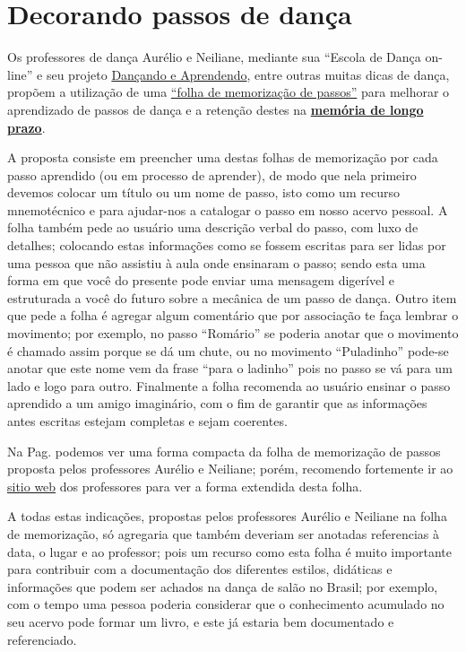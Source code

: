 
\section{Decorando passos de dança}
Os professores de dança Aurélio e Neiliane,
mediante sua ``Escola de Dança on-line'' e seu projeto 
\href{https://www.facebook.com/dancandoeaprendendo/}{Dançando e Aprendendo}, 
entre outras muitas dicas de dança,
propõem
a utilização de uma \href{https://www.youtube.com/watch?v=ePwjQx5egAo}{``folha de memorização de passos''} 
para melhorar o aprendizado de passos de dança 
e a retenção destes na \hyperref[sec:memoria:longo]{\textbf{memória de longo prazo}}.

A proposta consiste em preencher uma destas folhas de memorização
por cada passo aprendido (ou em processo de aprender),
de modo que nela primeiro devemos colocar um título ou um nome de passo,
isto como um recurso mnemotécnico e para ajudar-nos a catalogar o passo em nosso acervo pessoal.
A folha também pede ao usuário uma descrição verbal do passo, com luxo de detalhes;
colocando estas informações como se fossem escritas para ser lidas por uma pessoa 
que não assistiu à aula onde ensinaram o passo; 
sendo esta uma forma em que você do presente pode enviar 
uma mensagem digerível e estruturada a você do futuro
sobre a mecânica de um passo de dança.
Outro item que pede a folha é agregar algum comentário que por associação 
te faça lembrar o movimento; por exemplo, no passo ``Romário'' se poderia anotar que 
o movimento é chamado assim porque se dá um chute, ou 
no movimento ``Puladinho'' pode-se anotar que este nome vem da frase ``para o ladinho'' pois no passo 
se vá para um lado e logo para outro.
Finalmente a folha recomenda ao usuário
ensinar o passo aprendido a um amigo imaginário,
com o fim de garantir que as informações antes escritas estejam completas 
e sejam coerentes.

\begin{tcbattention}
Na Pag. \pageref{pos:page:folhamemorizacao} 
podemos ver uma forma compacta da folha de memorização 
de passos proposta pelos professores Aurélio e Neiliane; porém,
recomendo fortemente ir ao 
\href{https://www.youtube.com/watch?v=ePwjQx5egAo}{sitio web}
dos professores para ver a forma extendida desta folha.
\end{tcbattention}

A todas estas indicações, 
propostas pelos professores Aurélio e Neiliane
na folha de memorização,
só agregaria que também deveriam ser anotadas referencias 
à data, o lugar e ao professor; pois um recurso como esta folha é muito importante
para contribuir com a documentação dos diferentes estilos, didáticas e informações
que podem ser achados na dança de salão no Brasil;
por exemplo, com o tempo uma pessoa poderia considerar que o conhecimento 
acumulado no seu acervo pode formar um livro, 
e este já estaria bem documentado e referenciado.

